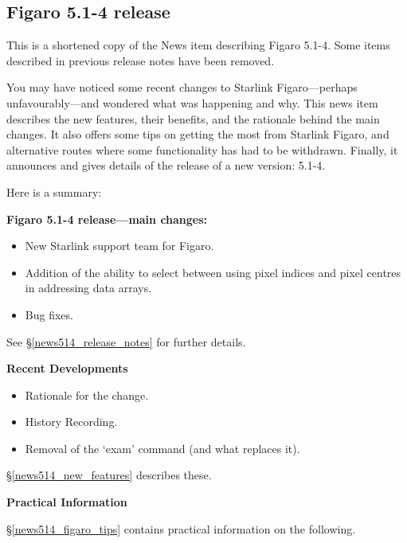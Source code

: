 \documentclass[11pt,twoside]{article}
\newcommand{\htmlref}[2]{#1}
\newcommand{\latorhtm}[2]{#1}
\newcommand{\latorhtm}[2]{#2}
\begin{document}

\subsection{\label{news514}Figaro 5.1-4 release}

This is a shortened copy of the News item describing Figaro 5.1-4.
Some items described in previous release notes have been removed.

 You may have noticed some recent changes to Starlink
 Figaro---perhaps unfavourably---and wondered what was happening
 and why.  This news item describes the new features, their
 benefits, and the rationale behind the main changes.  It also
 offers some tips on getting the most from Starlink Figaro, and
 alternative routes where some functionality has had to be
 withdrawn.  Finally, it announces and gives details of the
 release of a new version: 5.1-4.

 Here is a summary:

{\bf Figaro 5.1-4 release---main changes:}

\begin{itemize}
\item New Starlink support team for Figaro.
\item Addition of the ability to select between using pixel indices
      and pixel centres in addressing data arrays.
\item Bug fixes.
\end{itemize}

 See \latorhtm{\S\ref{news514_release_notes}}{the
 \htmlref{release notes}{news514_release_notes}} for further details.

{\bf Recent Developments}

\begin{itemize}
\item Rationale for the change.
\item History Recording.
\item Removal of the `exam' command (and what replaces it).
\end{itemize}

 \latorhtm{\S\ref{news514_new_features}}{\htmlref{New Figaro Features}
 {news514_new_features}} describes these.

{\bf Practical Information}

 \latorhtm{\S\ref{news514_figaro_tips}}{\htmlref{Figaro tips}
 {news514_figaro_tips}} contains practical information on the following.
\end{document}
